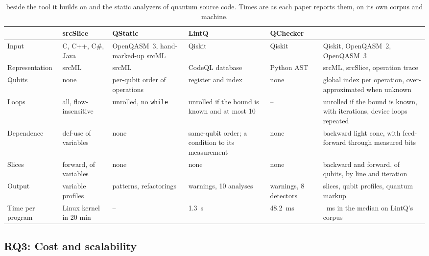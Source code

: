 \begin{table}[t]
  \centering
  \caption{\tool{} beside the tool it builds on and the static analyzers of quantum source code. Times are as each
  paper reports them, on its own corpus and machine.}
  \label{tab:b-tools}
  \footnotesize\setlength{\tabcolsep}{3.2pt}\renewcommand{\arraystretch}{1.1}
  \newcommand{\sep}{\arrayrulecolor{black!25}\hline\arrayrulecolor{black}}
  \begin{tabular}{@{}l p{2.75cm} p{2.75cm} p{2.9cm} p{2.6cm} p{3.85cm}@{}}
    \toprule
    \rowcolor{black!8}& \textbf{srcSlice}~\cite{alomari2014srcslice} & \textbf{QStatic}~\cite{behler2024supporting, behler2025static} & \textbf{LintQ}~\cite{paltenghi2024lintq} &
    \textbf{QChecker}~\cite{zhao2023qchecker} & \textbf{\tool{}} \\
    \midrule
    Input & C, C++, C\#, Java & OpenQASM~3, hand-marked-up srcML & Qiskit & Qiskit & Qiskit, OpenQASM~2, OpenQASM~3 \\ \sep
    Representation & srcML & srcML & CodeQL database & Python AST & srcML, srcSlice, operation trace \\ \sep
    Qubits & none & per-qubit order of operations & register and index & none & global index per operation,
    over-approximated when unknown \\ \sep
    Loops & all, flow-insensitive & unrolled, no \texttt{while} & unrolled if the bound is known and at most 10 & -- &
    unrolled if the bound is known, with iterations, device loops repeated \\ \sep
    Dependence & def-use of variables & none & same-qubit order; a condition to its measurement & none & backward
    light cone, with feed-forward through measured bits \\ \sep
    Slices & forward, of variables & none & none & none & backward and forward, of qubits, by line and
    iteration \\ \sep
    Output & variable profiles & patterns, refactorings & warnings, 10 analyses & warnings, 8 detectors &
    slices, qubit profiles, quantum markup \\ \sep
    Time per program & Linux kernel in 20 min & -- & 1.3~s & 48.2~ms & \numScaleSOneMedianMs{}~ms in the
    median on LintQ's corpus \\
    \bottomrule
  \end{tabular}
\end{table}

\subsection{RQ3: Cost and scalability}

